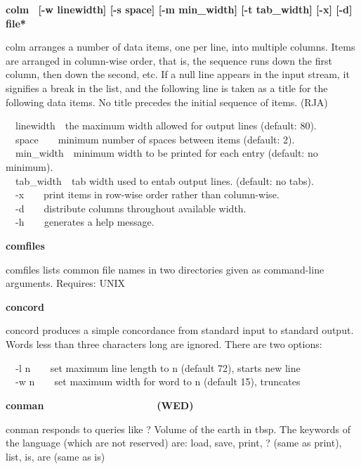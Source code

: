 {{\sffamily\bfseries
colm \ \textrm{\textmd{[-w linewidth] [-s space] [-m min\_width] [-t
tab\_width] [-x] [-d] file*}}}

\textsf{colm} arranges a number of data items, one per line, into
multiple columns. Items are arranged in column-wise order, that is, the
sequence runs down the first column, then down the second, etc. If a
null line appears in the input stream, it signifies a break in the
list, and the following line is taken as a title for the following data
items. No title precedes the initial sequence of items. (RJA)

\textsf{\ \ linewidth\ \ }the maximum width allowed for output lines
(default: 80).\\
\ \ \textsf{space\ \ \ \ }minimum number of spaces between items
(default: 2).\\
\ \ \textsf{min\_width\ \ }minimum width to be printed for each entry
(default: no minimum).\\
\ \ \textsf{tab\_width}\texttt{\ \ }tab width used to entab output
lines. (default: no tabs).\\
\ \ \textsf{{}-x}\ \ \ \ print items in row-wise order rather than
column-wise.\\
\ \ \textsf{{}-d}\ \ \ \ distribute columns throughout available
width.\\
\ \ \textsf{{}-h}\texttt{\ \ \ \ }generates a help message.

{\sffamily\bfseries
comfiles\ \ \ \ \ \ \ \ \ \ \ \ \ \ \ \ \ \ \ \ }

\textsf{comfiles} lists common file names in two directories given as
command-line arguments. Requires: UNIX 

{\sffamily\bfseries
concord\ \ \ \ \ \ \ \ \ \ \ \ \ \ \ \ \ \ \ \ }

\textsf{concord} produces a simple concordance from standard input to
standard output. Words less than three characters long are ignored.
There are two options:

\texttt{\ \ }\textsf{{}-l n}\texttt{\ \ }\ \ set maximum line length to
n (default 72), starts new line\\
\ \ \textsf{{}-w n}\texttt{\ \ }\ \ set maximum width for word to n
(default 15), truncates

{\sffamily\bfseries
conman\ \ \ \ \ \ \ \ \ \ \ \ \ \ \ \ \ \ \ \ (WED)}

\textsf{conman} responds to queries like {\textquotedbl}? Volume of the
earth in tbsp{\textquotedbl}. The keywords of the language (which are
not reserved) are: \textsf{load, save, print, ?} (same as print),
\textsf{list, is, are} (same as is)

}
